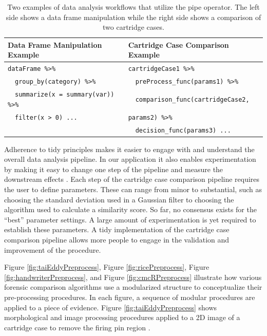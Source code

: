 \documentclass[11pt,]{isuthesis}
\begin{document}
\begin{table}[!htbp]
\centering
\begin{tabular}{l|l}
Data Frame Manipulation Example & Cartridge Case Comparison Example\\
\hline
\texttt{dataFrame \%>\%} & \texttt{cartridgeCase1 \%>\%} \\
\ \ \texttt{group\_by(category) \%>\%} & \ \ \texttt{preProcess\_func(params1) \%>\%}\\
\ \ \texttt{summarize(x = summary(var)) \%>\%} &\ \ \texttt{comparison\_func(cartridgeCase2,} \\
\ \ \texttt{filter(x > 0) ...} & \hspace{21ex}\texttt{params2) \%>\%} \\
& \ \ \texttt{decision\_func(params3) ...} \\
\end{tabular}
\caption{Two examples of data analysis workflows that utilize the pipe operator. The left side shows a data frame manipulation while the right side shows a comparison of two cartridge cases.}
\label{tab:pipelineTable}
\end{table}

Adherence to tidy principles makes it easier to engage with and understand the overall data analysis pipeline.
In our application it also enables experimentation by making it easy to change one step of the pipeline and measure the downstream effects \citep{reproducibleScience}.
Each step of the cartridge case comparison pipeline requires the user to define parameters.
These can range from minor to substantial, such as choosing the standard deviation used in a Gaussian filter to choosing the algorithm used to calculate a similarity score.
So far, no consensus exists for the ``best'' parameter settings.
A large amount of experimentation is yet required to establish these parameters.
A tidy implementation of the cartridge case comparison pipeline allows more people to engage in the validation and improvement of the procedure.

Figure \ref{fig:taiEddyPreprocess}, Figure \ref{fig:ricePreprocess}, Figure \ref{fig:handwriterPreprocess}, and Figure \ref{fig:cmcRPreprocess} illustrate how various forensic comparison algorithms use a modularized structure to conceptualize their pre-processing procedures.
In each figure, a sequence of modular procedures are applied to a piece of evidence.
Figure \ref{fig:taiEddyPreprocess} shows morphological and image processing procedures applied to a 2D image of a cartridge case to remove the firing pin region \citep{tai_fully_2018}.
\end{document}
